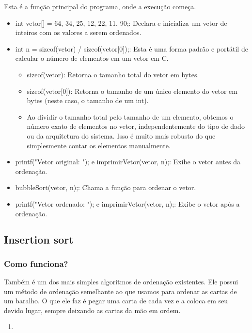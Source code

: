 \documentclass{report}
\begin{document}
\begin{enumerate}
		Esta é a função principal do programa, onde a execução começa.
		
		\begin{itemize}
			\item int vetor[] = {64, 34, 25, 12, 22, 11, 90};: Declara e inicializa um vetor de inteiros com os valores a serem ordenados.
			
			\item int n = sizeof(vetor) / sizeof(vetor[0]);: Esta é uma forma padrão e portátil de calcular o número de elementos em um vetor em C.
			
			\begin{itemize}
				\item sizeof(vetor): Retorna o tamanho total do vetor em bytes.
				\item sizeof(vetor[0]): Retorna o tamanho de um único elemento do vetor em bytes (neste caso, o tamanho de um int).
				\item Ao dividir o tamanho total pelo tamanho de um elemento, obtemos o número exato de elementos no vetor, independentemente do tipo de dado ou da arquitetura do sistema. Isso é muito mais robusto do que simplesmente contar os elementos manualmente.
			\end{itemize}
			\item printf("Vetor original: "); e imprimirVetor(vetor, n);: Exibe o vetor antes da ordenação.
			\item bubbleSort(vetor, n);: Chama a função para ordenar o vetor.
			\item printf("Vetor ordenado: "); e imprimirVetor(vetor, n);: Exibe o vetor após a ordenação.
		\end{itemize}
	\end{enumerate}
	\subsection{Insertion sort}
	\subsubsection{Como funciona?}
	Também é um dos mais simples algoritmos de ordenação existentes. Ele possui um método de ordenação semelhante ao que usamos para
	ordenar as cartas de um baralho. O que ele faz é pegar uma carta de cada vez e a coloca em seu devido lugar, sempre deixando as cartas da mão em ordem.
	
	\begin{enumerate}
		\item 
	\end{enumerate}
	
\end{document}
